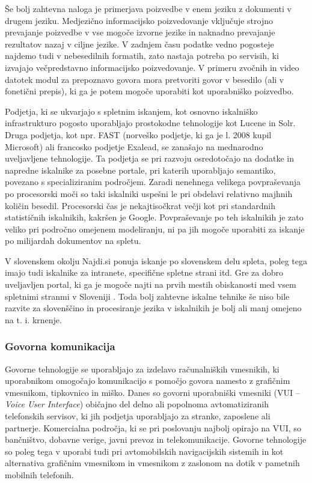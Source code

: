 \begin{multicols}{2}
Še bolj zahtevna naloga je primerjava poizvedbe v enem jeziku z dokumenti v drugem jeziku. Medjezično informacijsko poizvedovanje vključuje strojno prevajanje poizvedbe v vse mogoče izvorne jezike in naknadno prevajanje rezultatov nazaj v ciljne jezike. V zadnjem času podatke vedno pogosteje najdemo tudi v nebesedilnih formatih, zato nastaja potreba po servisih, ki izvajajo večpredstavno informacijsko poizvedovanje. V primeru zvočnih in video datotek modul za prepoznavo govora mora pretvoriti govor v besedilo (ali v fonetični prepis), ki ga je potem mogoče uporabiti kot uporabniško poizvedbo.


Podjetja, ki se ukvarjajo s spletnim iskanjem, kot osnovno iskalniško infrastrukturo pogosto uporabljajo prostokodne tehnologije kot Lucene in Solr. Druga podjetja, kot npr. FAST (norveško podjetje, ki ga je l. 2008 kupil Microsoft) ali francosko podjetje Exalead, se zanašajo na mednarodno uveljavljene tehnologije. 
Ta podjetja se pri razvoju osredotočajo na dodatke in napredne iskalnike za posebne portale, pri katerih uporabljajo semantiko, povezano s specializiranim področjem. Zaradi nenehnega velikega povpraševanja po procesorski moči so taki iskalniki uspešni le pri obdelavi relativno majhnih količin besedil. Procesorski čas je nekajtisočkrat večji kot pri standardnih statističnih iskalnikih, kakršen je Google. Povpraševanje po teh iskalnikih je zato veliko pri področno omejenem modeliranju, ni pa jih mogoče uporabiti za iskanje po milijardah dokumentov na spletu.

V slovenskem okolju Najdi.si ponuja iskanje po slovenskem delu spleta, poleg tega imajo tudi iskalnike za intranete, specifične spletne strani itd. Gre za dobro uveljavljen portal, ki ga je mogoče najti na prvih mestih obiskanosti med vsem spletnimi stranmi v Sloveniji \cite{moss1}.  Toda bolj zahtevne iskalne tehnike še niso bile razvite za slovenščino in procesiranje jezika v iskalnikih je bolj ali manj omejeno na t. i. krnenje.

\subsubsection{Govorna komunikacija}

Govorne tehnologije se uporabljajo za izdelavo računalniških vmesnikih, ki uporabnikom omogočajo komunikacijo s pomočjo govora namesto z grafičnim vmesnikom, tipkovnico in miško. Danes so govorni uporabniški vmesniki (VUI – \textit{Voice User Interface}) običajno del delno ali popolnoma avtomatiziranih telefonskih servisov, ki jih podjetja uporabljajo za stranke, zaposlene ali partnerje. Komercialna področja, ki se pri poslovanju najbolj opirajo na VUI, so bančništvo, dobavne verige, javni prevoz in telekomunikacije. Govorne tehnologije so poleg tega v uporabi tudi pri avtomobilskih navigacijskih sistemih in kot alternativa grafičnim vmesnikom in vmesnikom z zaslonom na dotik v pametnih mobilnih telefonih.


\end{multicols}
